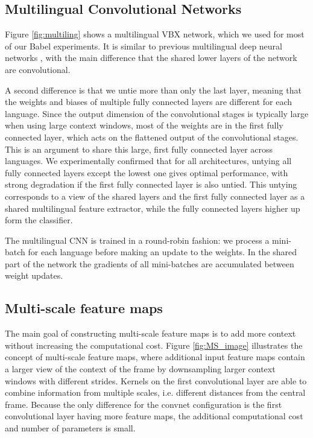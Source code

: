 \documentclass{article}
\begin{document}
\subsection{Multilingual Convolutional Networks}
\label{ssec:ML}

Figure \ref{fig:multiling} shows a multilingual VBX network, which we used for
most of our Babel experiments.
It is similar to previous multilingual deep neural networks \cite{scanzio2008use}, 
with the main difference that the shared lower layers of the network are convolutional.

A second difference is that we untie more than only the last layer,
meaning that the weights and biases of multiple fully connected layers are
different for each language.
Since the output dimension of the convolutional stages is typically large when using 
large context windows, most of the weights are
in the first fully connected layer, which acts on the flattened output of the convolutional stages.
This is an argument to share this large, first fully connected layer across languages.
We experimentally confirmed that for all architectures,
untying all fully connected layers except the lowest one gives optimal performance,
with strong degradation if the first fully connected layer is also untied.
This untying corresponds to a view of the shared layers and the first fully connected layer as a shared
multilingual feature extractor, while the fully connected layers higher up form the classifier.

The multilingual CNN is trained in a round-robin fashion:
we process a mini-batch for each language before making an update to the weights.
In the shared part of the network the gradients of all mini-batches are accumulated between weight updates.
\subsection{Multi-scale feature maps}
The main goal of constructing multi-scale feature maps is to add more context 
without increasing the computational cost.
Figure \ref{fig:MS_image} illustrates the concept of multi-scale feature maps,
where additional input feature maps contain a larger view of the context of the frame
by downsampling larger context windows with different strides.
Kernels on the first convolutional layer are able to combine information from
multiple scales, i.e. different distances from the central frame.
Because the only difference for the convnet configuration is the first convolutional
layer having more feature maps, the additional computational cost
and number of parameters is small.
\end{document}
